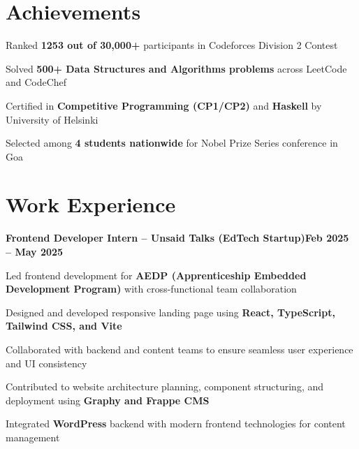 \documentclass[letterpaper,10pt]{article}
\newcommand{\heading}[2]{
  \hspace{10pt}#1\hfill#2\\
}
\newcommand{\headingBf}[2]{
  \heading{\textbf{#1}}{\textbf{#2}}
}
\newenvironment{resume_list}{
  \vspace{-7pt}
  \begin{itemize}[itemsep=-2px, parsep=1pt, leftmargin=30pt]
}{
  \end{itemize}
}
\begin{document}

  \section{Achievements}

  \begin{resume_list}
    \item Ranked \textbf{1253 out of 30,000+} participants in Codeforces Division 2 Contest
    \item Solved \textbf{500+ Data Structures and Algorithms problems} across LeetCode and CodeChef
    \item Certified in \textbf{Competitive Programming (CP1/CP2)} and \textbf{Haskell} by University of Helsinki
    \item Selected among \textbf{4 students nationwide} for Nobel Prize Series conference in Goa
  \end{resume_list}


  \section{Work Experience}

  \headingBf{Frontend Developer Intern -- Unsaid Talks (EdTech Startup)}{Feb 2025 -- May 2025}
  \begin{resume_list}
    \item Led frontend development for \textbf{AEDP (Apprenticeship Embedded Development Program)} with cross-functional team collaboration
    \item Designed and developed responsive landing page using \textbf{React, TypeScript, Tailwind CSS, and Vite}
    \item Collaborated with backend and content teams to ensure seamless user experience and UI consistency
    \item Contributed to website architecture planning, component structuring, and deployment using \textbf{Graphy and Frappe CMS}
    \item Integrated \textbf{WordPress} backend with modern frontend technologies for content management
  \end{resume_list}
\end{document}
